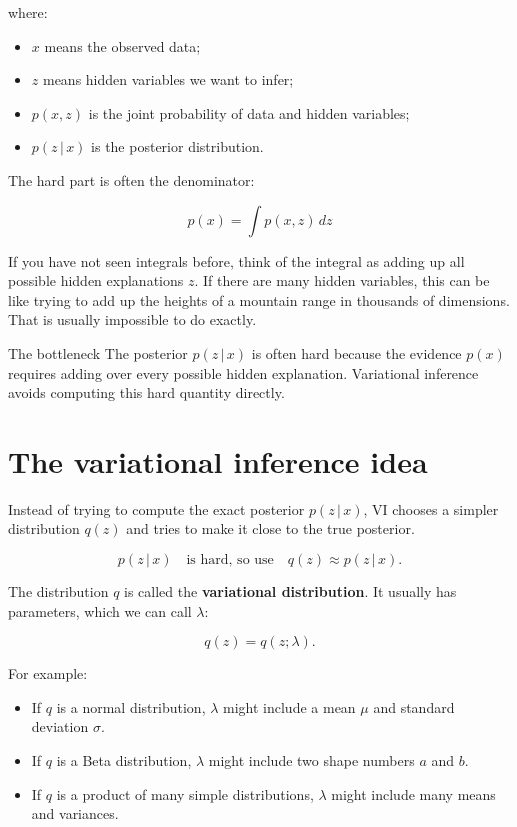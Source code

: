\documentclass[11pt]{article}
\newcommand{\given}{\,|\,}
\begin{document}
where:

\begin{itemize}[leftmargin=*]
  \item $x$ means the observed data;
  \item $z$ means hidden variables we want to infer;
  \item $p(x,z)$ is the joint probability of data and hidden variables;
  \item $p(z \given x)$ is the posterior distribution.
\end{itemize}

The hard part is often the denominator:

\begin{equation}
\boxed{
  p(x) = \int p(x,z)\,dz
}
\end{equation}

If you have not seen integrals before, think of the integral as adding up all possible hidden explanations $z$.
If there are many hidden variables, this can be like trying to add up the heights of a mountain range in thousands of dimensions.
That is usually impossible to do exactly.

\begin{warningbox}{The bottleneck}
The posterior $p(z \given x)$ is often hard because the evidence $p(x)$ requires adding over every possible hidden explanation. Variational inference avoids computing this hard quantity directly.
\end{warningbox}

\section{The variational inference idea}

Instead of trying to compute the exact posterior $p(z \given x)$, VI chooses a simpler distribution $q(z)$ and tries to make it close to the true posterior.

\begin{equation}
\boxed{
  p(z \given x) \quad \text{is hard, so use} \quad q(z) \approx p(z \given x).
}
\end{equation}

The distribution $q$ is called the \textbf{variational distribution}.
It usually has parameters, which we can call $\lambda$:

\[
q(z) = q(z;\lambda).
\]

For example:

\begin{itemize}[leftmargin=*]
  \item If $q$ is a normal distribution, $\lambda$ might include a mean $\mu$ and standard deviation $\sigma$.
  \item If $q$ is a Beta distribution, $\lambda$ might include two shape numbers $a$ and $b$.
  \item If $q$ is a product of many simple distributions, $\lambda$ might include many means and variances.
\end{itemize}
\end{document}
